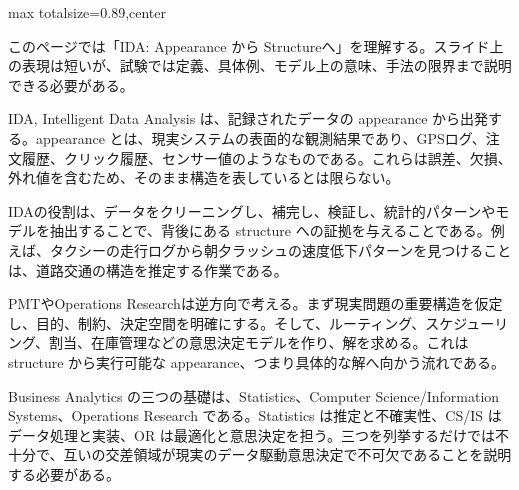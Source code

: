 \begin{minipage}[t]{0.58\textwidth}
\begin{adjustbox}{max totalsize={\textwidth}{0.89\textheight},center}
\begin{minipage}{\textwidth}\scriptsize
{}このページでは「IDA: Appearance から Structureへ」を理解する。スライド上の表現は短いが、試験では定義、具体例、モデル上の意味、手法の限界まで説明できる必要がある。\par
IDA, Intelligent Data Analysis は、記録されたデータの appearance から出発する。appearance とは、現実システムの表面的な観測結果であり、GPSログ、注文履歴、クリック履歴、センサー値のようなものである。これらは誤差、欠損、外れ値を含むため、そのまま構造を表しているとは限らない。\par
IDAの役割は、データをクリーニングし、補完し、検証し、統計的パターンやモデルを抽出することで、背後にある structure への証拠を与えることである。例えば、タクシーの走行ログから朝夕ラッシュの速度低下パターンを見つけることは、道路交通の構造を推定する作業である。\par
PMTやOperations Researchは逆方向で考える。まず現実問題の重要構造を仮定し、目的、制約、決定空間を明確にする。そして、ルーティング、スケジューリング、割当、在庫管理などの意思決定モデルを作り、解を求める。これは structure から実行可能な appearance、つまり具体的な解へ向かう流れである。\par
Business Analytics の三つの基礎は、Statistics、Computer Science/Information Systems、Operations Research である。Statistics は推定と不確実性、CS/IS はデータ処理と実装、OR は最適化と意思決定を担う。三つを列挙するだけでは不十分で、互いの交差領域が現実のデータ駆動意思決定で不可欠であることを説明する必要がある。\par

\end{minipage}
\end{adjustbox}
\end{minipage}
